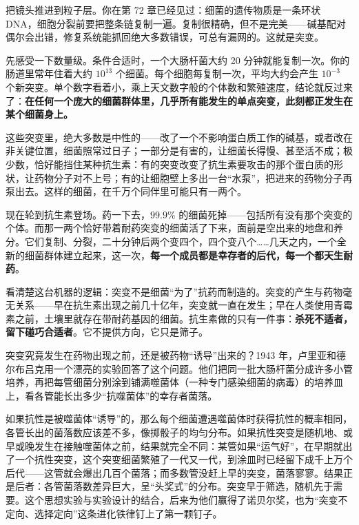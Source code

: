 把镜头推进到粒子层。你在第 72 章已经见过：细菌的遗传物质是一条环状 DNA，细胞分裂前要把整条链复制一遍。复制很精确，但不是完美——碱基配对偶尔会出错，修复系统能抓回绝大多数错误，可总有漏网的。这就是突变。

先感受一下数量级。条件合适时，一个大肠杆菌大约 20 分钟就能复制一次。你的肠道里常年住着大约 $10^{13}$ 个细菌。每个细胞每复制一次，平均大约会产生 $10^{-3}$ 个新突变。单个数字看着小，乘上天文数字般的个体数和繁殖速度，结论就反过来了：\textbf{在任何一个庞大的细菌群体里，几乎所有能发生的单点突变，此刻都正发生在某个细菌身上。}

这些突变里，绝大多数是中性的——改了一个不影响蛋白质工作的碱基，或者改在非关键位置，细菌照常过日子；一部分是有害的，让细菌长得慢、甚至活不成；极少数，恰好能挡住某种抗生素：有的突变改变了抗生素要攻击的那个蛋白质的形状，让药物分子对不上号；有的让细胞壁上多出一台“水泵”，把进来的药物分子再泵出去。这样的细菌，在千万个同伴里可能只有一两个。

现在轮到抗生素登场。药一下去，$99.9\%$ 的细菌死掉——包括所有没有那个突变的个体。而那一两个恰好带着耐药突变的细菌活了下来，面前是空出来的地盘和养分。它们复制、分裂，二十分钟后两个变四个，四个变八个……几天之内，一个全新的细菌群体建立起来，这一次，\textbf{每一个成员都是幸存者的后代，每一个都天生耐药}。

看清楚这台机器的逻辑：突变不是细菌“为了”抗药而制造的。突变的产生与药物毫无关系——早在抗生素出现之前几十亿年，突变就一直在发生；早在人类使用青霉素之前，土壤里就存在带耐药基因的细菌。抗生素做的只有一件事：\textbf{杀死不适者，留下碰巧合适者}。它不提供方向，它只是筛子。

\begin{zhengju}
突变究竟发生在药物出现之前，还是被药物“诱导”出来的？1943 年，卢里亚和德尔布吕克用一个漂亮的实验回答了这个问题。他们把同一批大肠杆菌分成许多小管培养，再把每管细菌分别涂到铺满噬菌体（一种专门感染细菌的病毒）的培养皿上，看各管能长出多少“抗噬菌体”的幸存者菌落。

如果抗性是被噬菌体“诱导”的，那么每个细菌遭遇噬菌体时获得抗性的概率相同，各管长出的菌落数应该差不多，像掷骰子的均匀分布。如果抗性突变是随机地、或早或晚发生在接触噬菌体之前，结果就完全不同：某管如果“运气好”，在早期就出了一个抗性突变，这个突变细菌繁殖了一代又一代，到涂皿时已经留下成千上万个后代——这管就会爆出几百个菌落；而多数管没赶上早的突变，菌落寥寥。结果正是后者：各管菌落数差异巨大，呈“头奖式”的分布。突变早于筛选，随机先于需要。这个思想实验与实验设计的结合，后来为他们赢得了诺贝尔奖，也为“突变不定向、选择定向”这条进化铁律钉上了第一颗钉子。
\end{zhengju}

